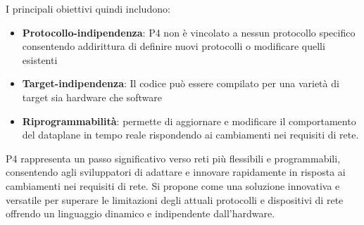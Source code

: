 I principali obiettivi quindi includono:
\begin{itemize}
    \item \textbf{Protocollo-indipendenza}: P4 non è vincolato a nessun protocollo specifico consentendo addirittura di definire nuovi protocolli o modificare quelli esistenti
    \item \textbf{Target-indipendenza}: Il codice può essere compilato per una varietà di target sia hardware che software
    \item \textbf{Riprogrammabilità}: permette di aggiornare e modificare il comportamento del dataplane in tempo reale rispondendo ai cambiamenti nei requisiti di rete.
\end{itemize}
P4 rappresenta un passo significativo verso reti più flessibili e programmabili, consentendo agli sviluppatori di adattare e innovare rapidamente in risposta ai cambiamenti nei requisiti di rete.
Si propone come una soluzione innovativa e versatile per superare le limitazioni degli attuali protocolli e dispositivi di rete offrendo un linguaggio dinamico e indipendente dall'hardware.


